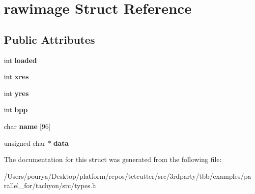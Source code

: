 \hypertarget{structrawimage}{}\section{rawimage Struct Reference}
\label{structrawimage}
\subsection*{Public Attributes}
\begin{DoxyCompactItemize}
\item 
\hypertarget{structrawimage_a3d98f8d82de6635eb8e3b3e58fdc4f6e}{}int {\bfseries loaded}\label{structrawimage_a3d98f8d82de6635eb8e3b3e58fdc4f6e}

\item 
\hypertarget{structrawimage_a49fbb021f5fa815d823b685069405df1}{}int {\bfseries xres}\label{structrawimage_a49fbb021f5fa815d823b685069405df1}

\item 
\hypertarget{structrawimage_ad2bb10a30a4bb23ac30b1a2da81bbb3f}{}int {\bfseries yres}\label{structrawimage_ad2bb10a30a4bb23ac30b1a2da81bbb3f}

\item 
\hypertarget{structrawimage_acd1560bd319b3209bda322450280c836}{}int {\bfseries bpp}\label{structrawimage_acd1560bd319b3209bda322450280c836}

\item 
\hypertarget{structrawimage_abb5eacc55465abebcef11cf7731bb729}{}char {\bfseries name} \mbox{[}96\mbox{]}\label{structrawimage_abb5eacc55465abebcef11cf7731bb729}

\item 
\hypertarget{structrawimage_aada4ac989acf75a4ef786792827e8d06}{}unsigned char $\ast$ {\bfseries data}\label{structrawimage_aada4ac989acf75a4ef786792827e8d06}

\end{DoxyCompactItemize}


The documentation for this struct was generated from the following file\+:\begin{DoxyCompactItemize}
\item 
/\+Users/pourya/\+Desktop/platform/repos/tetcutter/src/3rdparty/tbb/examples/parallel\+\_\+for/tachyon/src/types.\+h\end{DoxyCompactItemize}
